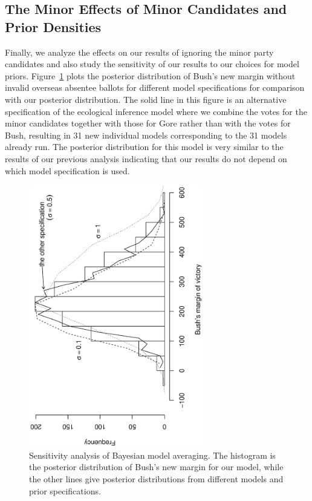 \documentclass[11pt,titlepage]{article}
\begin{document}
\subsection{The Minor Effects of Minor Candidates and Prior Densities} 
\label{s:sens}

Finally, we analyze the effects on our results of ignoring the minor
party candidates and also study the sensitivity of our results to our
choices for model priors.  Figure~\ref{fg:sensitivity} plots the
posterior distribution of Bush's new margin without invalid overseas
absentee ballots for different model specifications for comparison
with our posterior distribution.  The solid line in this figure is an
alternative specification of the ecological inference model where we
combine the votes for the minor candidates together with those for
Gore rather than with the votes for Bush, resulting in 31 new
individual models corresponding to the 31 models already run.  The
posterior distribution for this model is very similar to the results
of our previous analysis indicating that our results do not depend on
which model specification is used.
\begin{figure}[t]
\begin{center}
\includegraphics[width=3in,height=4.5in,angle=-90]{sensitivity}
\caption{Sensitivity analysis of Bayesian model
  averaging. The histogram is the posterior distribution of Bush's new
  margin for our model, while the other lines give posterior
  distributions from different models and prior specifications.}
\label{fg:sensitivity}
\end{center} 
\end{figure}
\end{document}
